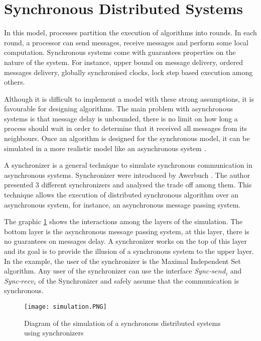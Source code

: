 \section{Synchronous Distributed Systems}
\label{chap:3}

In this model, processes partition the execution of algorithms into rounds. In each round, a processor can send messages, receive messages and perform some local computation. Synchronous systems come with guarantees properties on the nature of the system. For instance, upper bound on message delivery, ordered messages delivery, globally synchronised clocks, lock step based execution among others. 

Although it is difficult to implement a model with these strong assumptions, it is favourable for designing algorithms. The main problem with asynchronous systems is that message delay is unbounded, there is no limit on how long a process should wait in order to determine that it received all messages from its neighbours. Once an algorithm is designed for the synchronous model, it can be simulated in a more realistic model like an asynchronous system \cite{attiya2004distributed}.

A synchronizer is a general technique to simulate synchronous communication in asynchronous systems. Synchronizer were introduced by Awerbuch \cite{awerbuch1985complexity}. The author presented 3 different synchronizers and analysed the trade off among them. This technique allows the execution of distributed synchronous algorithm over an asynchronous system, for instance, an asynchronous message passing system.  

The graphic \ref{fig:simulation} shows the interactions among the layers of the simulation. The bottom layer is the asynchronous message passing system, at this layer, there is no guarantees on messages delay. A synchronizer works on the top of this layer and its goal is to provide the illusion of a synchronous system to the upper layer. In the example, the user of the synchronizer is the Maximal Independent Set algorithm. Any user of the synchronizer can use the interface \textit{Sync-}$send_i$ and \textit{Sync-}$recv_i$ of the Synchronizer and safely assume that the communication is synchronous.     

\begin{figure}[ht]
\centering
\texttt{[image: simulation.PNG]} 
\caption{Diagram of the simulation of a synchronous distributed systems using synchronizers}
\label{fig:simulation}
\end{figure}



